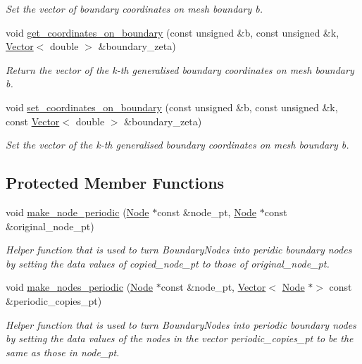\begin{DoxyCompactItemize}
\begin{DoxyCompactList}\small\item\em Set the vector of boundary coordinates on mesh boundary b. \end{DoxyCompactList}\item 
void \hyperlink{classoomph_1_1BoundaryNodeBase_a6dd015b923a309292616805a658eb401}{get\+\_\+coordinates\+\_\+on\+\_\+boundary} (const unsigned \&b, const unsigned \&k, \hyperlink{classoomph_1_1Vector}{Vector}$<$ double $>$ \&boundary\+\_\+zeta)
\begin{DoxyCompactList}\small\item\em Return the vector of the k-\/th generalised boundary coordinates on mesh boundary b. \end{DoxyCompactList}\item 
void \hyperlink{classoomph_1_1BoundaryNodeBase_a45d53bb02ccf50ab551d051b5e2d4777}{set\+\_\+coordinates\+\_\+on\+\_\+boundary} (const unsigned \&b, const unsigned \&k, const \hyperlink{classoomph_1_1Vector}{Vector}$<$ double $>$ \&boundary\+\_\+zeta)
\begin{DoxyCompactList}\small\item\em Set the vector of the k-\/th generalised boundary coordinates on mesh boundary b. \end{DoxyCompactList}\end{DoxyCompactItemize}
\subsection*{Protected Member Functions}
\begin{DoxyCompactItemize}
\item 
void \hyperlink{classoomph_1_1BoundaryNodeBase_a335936260b9a5d6ed4e191e4c44ab3a2}{make\+\_\+node\+\_\+periodic} (\hyperlink{classoomph_1_1Node}{Node} $\ast$const \&node\+\_\+pt, \hyperlink{classoomph_1_1Node}{Node} $\ast$const \&original\+\_\+node\+\_\+pt)
\begin{DoxyCompactList}\small\item\em Helper function that is used to turn Boundary\+Nodes into peridic boundary nodes by setting the data values of copied\+\_\+node\+\_\+pt to those of original\+\_\+node\+\_\+pt. \end{DoxyCompactList}\item 
void \hyperlink{classoomph_1_1BoundaryNodeBase_aad627350ff61b7bfb86d6df80b8b9c77}{make\+\_\+nodes\+\_\+periodic} (\hyperlink{classoomph_1_1Node}{Node} $\ast$const \&node\+\_\+pt, \hyperlink{classoomph_1_1Vector}{Vector}$<$ \hyperlink{classoomph_1_1Node}{Node} $\ast$$>$ const \&periodic\+\_\+copies\+\_\+pt)
\begin{DoxyCompactList}\small\item\em Helper function that is used to turn Boundary\+Nodes into periodic boundary nodes by setting the data values of the nodes in the vector periodic\+\_\+copies\+\_\+pt to be the same as those in node\+\_\+pt. \end{DoxyCompactList}\end{DoxyCompactItemize}
